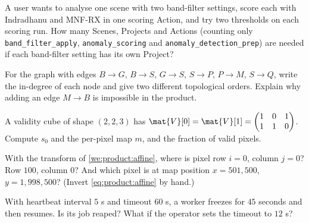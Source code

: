 \begin{checkyourself}
\item\label{ex:product:1} A user wants to analyse one scene with two band-filter settings, score each
with Indradhanu and MNF-RX in one scoring Action, and try two thresholds on each scoring run. How many
Scenes, Projects and Actions (counting only \texttt{band\_filter\_apply}, \texttt{anomaly\_scoring}
and \texttt{anomaly\_detection\_prep}) are needed if each band-filter setting has its own Project?
\item\label{ex:product:2} For the graph with edges $B \to G$, $B \to S$, $G \to S$, $S \to P$,
$P \to M$, $S \to Q$, write the in-degree of each node and give two different topological orders.
Explain why adding an edge $M \to B$ is impossible in the product.
\item\label{ex:product:3} A validity cube of shape $(2, 2, 3)$ has $\mat{V}[0] = \mat{V}[1] =
\begin{pmatrix}1&0&1\\1&1&0\end{pmatrix}$. Compute $s_0$ and the per-pixel map $m$, and the fraction
of valid pixels.
\item\label{ex:product:4} With the transform of \cref{we:product:affine}, where is pixel row $i = 0$,
column $j = 0$? Row $100$, column $0$? And which pixel is at map position
$x = 501{,}500$, $y = 1{,}998{,}500$? (Invert \cref{eq:product:affine} by hand.)
\item\label{ex:product:5} With heartbeat interval $5$ s and timeout $60$ s, a worker freezes for
$45$ seconds and then resumes. Is its job reaped? What if the operator sets the timeout to $12$ s?
\end{checkyourself}

